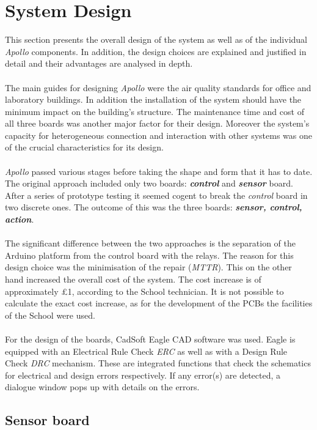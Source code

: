 \documentclass[12pt,a4paper]{report}
\begin{document}
\chapter{System Design}
This section presents the overall design of the system as well as of the individual \emph{Apollo} components.
In addition, the design choices are explained and justified in detail and their advantages are analysed in depth.\\
\ \\
The main guides for designing \emph{Apollo} were the air quality standards for office and laboratory buildings. In addition the installation of the system should have the minimum impact on the building's structure. The maintenance time and cost of all three boards was another major factor for their design. Moreover the system's capacity for heterogeneous connection and interaction with other systems was one of the crucial characteristics for its design. \\
\ \\
\emph{Apollo} passed various stages before taking the shape and form that it has to date.
The original approach included only two boards: \textbf{\textit{control}} and \textbf{\textit{sensor}} board.
After a series of prototype testing it seemed cogent to break the \textit{control} board in two discrete ones.
The outcome of this was the three boards: \textbf{\textit{sensor, control, action}}.\\
\ \\
The significant difference between the two approaches is the separation of the Arduino platform from the control board with the relays.
The reason for this design choice was the minimisation of the repair (\textit{MTTR}).
This on the other hand increased the overall cost of the system.
The cost increase is of approximately £1, according to the School technician.
It is not possible to calculate the exact cost increase, as for the development of the PCBs the facilities of the School were used.\\
\ \\
For the design of the boards, CadSoft Eagle CAD software was used. Eagle is equipped with an Electrical Rule Check \textit{ERC} as well as with a Design Rule Check \textit{DRC} mechanism.
These are integrated functions that check the schematics for electrical and design errors respectively.
If any error(s) are detected, a dialogue window pops up with details on the errors.
%
\section{Sensor board}
\end{document}
